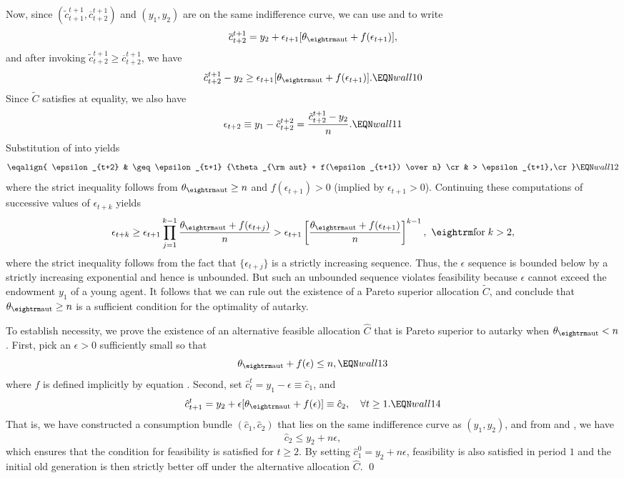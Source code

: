 Now, since $(\tilde c^{t+1}_{t+1},\overline c^{t+1}_{t+2})$ and
$(y_1,y_2)$ are on the same indifference curve, we can use
 and  to write
$$
\overline c^{t+1}_{t+2} = y_2 + \epsilon_{t+1} [\theta_{\rm aut}
                                 + f(\epsilon_{t+1})],
$$
and after invoking $\tilde c^{t+1}_{t+2} \geq \overline c^{t+1}_{t+2}$,
we have
$$
\tilde c^{t+1}_{t+2} - y_2 \geq \epsilon_{t+1} [\theta_{\rm aut}
                                 + f(\epsilon_{t+1})].       \EQN wall10
$$
Since $\tilde C$ satisfies  at equality, we also have
$$
\epsilon_{t+2} \equiv y_1 - \tilde c^{t+2}_{t+2}
= {\tilde c^{t+1}_{t+2} - y_2 \over n}.                     \EQN wall11
$$
Substitution of  into  yields
{\ninepoint
$$\eqalign{ \epsilon_{t+2} & \geq  \epsilon_{t+1}
                 {\theta_{\rm aut} + f(\epsilon_{t+1}) \over n} \cr
                & > \epsilon_{t+1},\cr}\EQN wall12
$$
}%
where the strict inequality follows from
$\theta_{\rm aut} \geq n$ and $f(\epsilon_{t+1})>0$ (implied by
$\epsilon_{t+1}>0$).
Continuing these computations of successive values of $\epsilon_{t+k}$ yields
{\ninepoint
$$
\epsilon_{t+k} \geq \epsilon_{t+1}
         \prod_{j=1}^{k-1}
{\theta_{\rm aut} + f(\epsilon_{t+j}) \over n}
 > \epsilon_{t+1} \left[{\theta_{\rm aut} +
 f(\epsilon_{t+1}) \over n} \right]^{k-1},
\ \hbox{\rm for}\;k>2,
$$
}%
where the strict inequality follows from the fact that $\{\epsilon_{t+j}\}$
is a strictly increasing sequence.
Thus, the $\epsilon$ sequence is bounded below by a strictly increasing
exponential and hence is unbounded. But such an unbounded sequence violates
feasibility because $\epsilon$ cannot exceed the endowment $y_1$ of a
young agent. It follows that we can rule out the existence of a
Pareto superior allocation $\tilde C$, and conclude that
$\theta_{\rm aut} \geq n$ is
a sufficient condition for the optimality of autarky.

To establish necessity, we prove the existence of an alternative
feasible allocation $\hat C$ that is Pareto superior to autarky when
$\theta_{\rm aut} < n$. First, pick an $\epsilon > 0$ sufficiently
small so that
$$
\theta_{\rm aut} + f(\epsilon) \leq n,                      \EQN wall13
$$
where $f$ is defined implicitly by equation .
Second, set $\hat c^t_t= y_1 - \epsilon \equiv \hat c_1$, and
$$
\hat c^t_{t+1} = y_2 + \epsilon [\theta_{\rm aut} + f(\epsilon)]
               \equiv \hat c_2,    \quad  \forall t \geq 1. \EQN wall14
$$
That is, we have constructed a consumption bundle
$(\hat c_1, \hat c_2)$ that lies on the same indifference curve as
$(y_1, y_2)$, and from  and , we have
$$
\hat c_2 \leq y_2 + n \epsilon,
$$
which ensures that the condition for feasibility  is satisfied
for $t\geq 2$. By setting $\hat c^0_1 = y_2 + n \epsilon$, feasibility
is also satisfied in period $1$ and the initial old generation is
then strictly better off under the alternative allocation $\hat C$.
\qed

